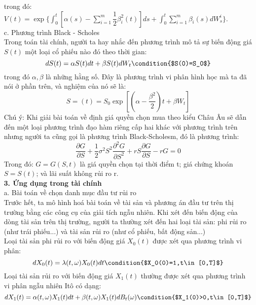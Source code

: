 \documentclass[14pt,a4paper]{article}
\numberwithin{equation}{section}
\begin{document}
trong đó: $V(t)=\exp\{\int_{0}^{t}[\alpha(s)-\sum_{i=1}^{m}\dfrac{1}{2}\beta_i^2(t)]ds+\int_{0}^{t}\sum_{i=1}^{m}\beta_i(s)dW_s^i \}$.\\
c. Phương trình Black - Scholes\\
Trong toán tài chính, người ta hay nhắc đến phương trình mô tả sự biến động giá $S(t)$ một loại cổ phiếu nào đó theo thời gian:
\begin{equation*}
	dS(t)=\alpha S(t)dt+\beta S(t)dW_t \condition{$S(0)=S_0$}
\end{equation*}
trong đó $\alpha,\beta$ là những hằng số. Đây là phương trình vi phân hình học mà ta đã nói ở phần trên, và nghiệm của nó sẽ là:
\begin{equation*}
	S=(t)=S_0\exp\left[\left(\alpha-\dfrac{\beta^2}{2} \right)t+\beta W_t \right]
\end{equation*}
Chú ý: Khi giải bài toán về định giá quyền chọn mua theo kiểu Châu Âu sẽ dẫn đến một loại phương trình đạo hàm riêng cấp hai khác với phương trình trên nhưng người ta cũng gọi là phương trình Black-Scholesm, đó là phương trình:
\begin{equation*}
	\dfrac{\partial G}{\partial S}+\dfrac{1}{2}\sigma^2S^2\dfrac{\partial^2G}{\partial S^2}+rS\dfrac{\partial G}{\partial S}-rG=0
\end{equation*}
Trong đó: $G=G(S,t)$ là giá quyền chọn tại thời điểm t; giá chứng khoán $S=S(t)$; và lãi suất không rủi ro r.\\
\textbf{3. Ứng dụng trong tài chính}\\
a. Bài toán về chọn danh mục đầu tư rủi ro\\
Trước hết, ta mô hình hoá bài toán về tài sản và phương án đầu tư trên thị trường bằng các công cụ của giải tích ngẫu nhiên. Khi xét đến biến động của dòng tài sản trên thị trường, người ta thường xét đến hai loại tài sản: phi rủi ro (như trái phiếu...) và tài sản rủi ro (như cổ phiếu, bất động sản...)\\
Loại tài sản phi rủi ro với biến động giá $X_0(t)$ được xét qua phương trình vi phân:
\begin{equation*}
	dX_0(t)=\lambda(t,\omega)X_0(t)dt \condition{$X_0(0)=1,t\in[0,T]$}
\end{equation*}
Loại tài sản rủi ro với biến động giá $X_1(t)$ thường được xét qua phương trình vi phân ngẫu nhiên Itô có dạng:
\begin{equation}\label{eq:ud1}
	dX_1(t)=\alpha(t,\omega)X_1(t)dt+\beta(t,\omega)X_1(t)dB_t(\omega) \condition{$X_1(0)>0,t\in[0,T]$}
\end{equation}
\end{document}
